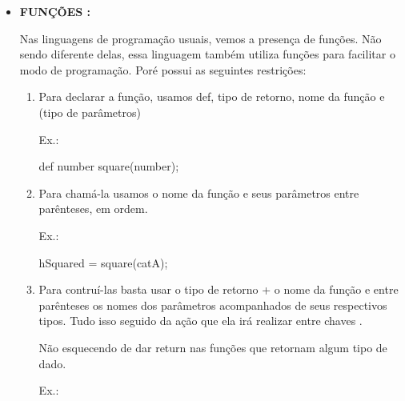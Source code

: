 \documentclass[a4paper]{article}
\begin{document}
{{{{{\begin{itemize}
            \ \ \ \ \}
           
            \}
        
        \bigskip   
                           
        \item \textbf{FUNÇÕES :}
            
            Nas linguagens de programação usuais, vemos a
            presença de funções.
            Não sendo diferente delas, essa linguagem também
            utiliza funções para facilitar o modo de programação.
            Poré possui as seguintes restrições:
                       
            \begin{enumerate}
                
                \item Para declarar a função, usamos 
           	        \textcolor{NavyBlue}{def}, tipo de retorno, nome
            	    da função e (tipo de parâmetros)
            	
                	\textcolor{NavyBlue}{Ex.:}
                	
                	\textcolor{NavyBlue}{def}
                	number square(number);
                	
            	\bigskip

                \item Para chamá-la usamos
                    o nome da função e seus parâmetros entre 
                    parênteses, em ordem.
                    
                    \textcolor{NavyBlue}{Ex.:}
                    
                    hSquared = square(catA);
                
                \bigskip
                
                \item Para contruí-las basta usar  o tipo
                    de retorno + o nome da função e entre
                    parênteses os nomes dos parâmetros acompanhados de 
                    seus respectivos tipos. Tudo isso seguido da ação que
                    ela irá realizar entre chaves {}.
                    
                    Não esquecendo de dar
                    \textcolor{NavyBlue}{return}
                    nas funções que retornam algum tipo de dado.
                    
                    \textcolor{NavyBlue}{Ex.:}
                    

\end{enumerate}
\end{itemize}}}}}}
\end{document}
